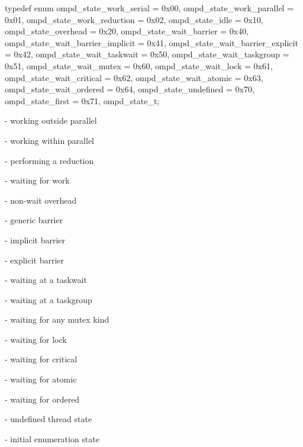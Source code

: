 \begin{ccppspecific}
\begin{ompSyntax}
typedef enum {
  ompd_state_work_serial = 0x00,
  ompd_state_work_parallel = 0x01,
  ompd_state_work_reduction = 0x02,
  ompd_state_idle = 0x10,
  ompd_state_overhead = 0x20,
  ompd_state_wait_barrier = 0x40,
  ompd_state_wait_barrier_implicit = 0x41,
  ompd_state_wait_barrier_explicit = 0x42,
  ompd_state_wait_taskwait = 0x50,
  ompd_state_wait_taskgroup = 0x51,
  ompd_state_wait_mutex = 0x60,
  ompd_state_wait_lock = 0x61,
  ompd_state_wait_critical = 0x62,
  ompd_state_wait_atomic = 0x63,
  ompd_state_wait_ordered = 0x64,
  ompd_state_undefined = 0x70,
  ompd_state_first = 0x71,
} ompd_state_t;
\end{ompSyntax}
\end{ccppspecific}


\descr
\label{ompd_state_work_serial}
 - 
working outside parallel
 
\label{ompd_state_work_parallel}
 - 
working within parallel

\label{ompd_state_work_reduction}
 - 
performing a reduction

\label{ompd_state_idle}
 - 
waiting for work
 
\label{ompd_state_overhead}
 - 
non-wait overhead

\label{ompd_state_wait_barrier}
 - 
generic barrier

\label{ompd_state_wait_barrier_implicit}
 - 
implicit barrier

\label{ompd_state_wait_barrier_explicit}
 - 
explicit barrier

\label{ompd_state_wait_taskwait}
 - 
waiting at a taskwait

\label{ompd_state_wait_taskgroup}
 - 
waiting at a taskgroup

\label{ompd_state_wait_mutex}
 - 
waiting for any mutex kind

\label{ompd_state_wait_lock}
 - 
waiting for lock

\label{ompd_state_wait_critical}
 - 
waiting for critical

\label{ompd_state_wait_atomic}
 - 
waiting for atomic

\label{ompd_state_wait_ordered}
 - 
waiting for ordered

\label{ompd_state_undefined}
 - 
undefined thread state

\label{ompd_state_first}
 - 
initial enumeration state
